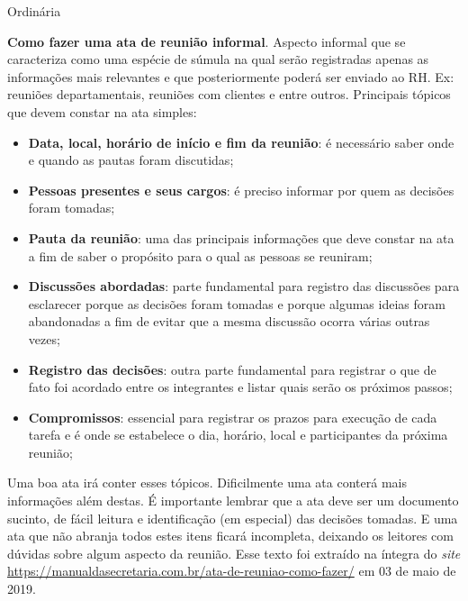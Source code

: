 \documentclass[11pt]{ifscata}
\date{03 de dezembro de 2019}
\begin{document}
\begin{reuniao}{Ordinária} %

\begin{informes}
    \item \textbf{Como fazer uma ata de reunião informal}. Aspecto informal que se caracteriza como uma espécie de súmula na qual serão registradas apenas as informações mais relevantes e que posteriormente poderá ser enviado ao RH. Ex: reuniões departamentais, reuniões com clientes e entre outros. Principais tópicos que devem constar na ata simples:
    \begin{itemize}
        \item \textbf{Data, local, horário de início e fim da reunião}: é necessário saber onde e quando as pautas foram discutidas;
        \item \textbf{Pessoas presentes e seus cargos}: é preciso informar por quem as decisões foram tomadas;
        \item \textbf{Pauta da reunião}: uma das principais informações que deve constar na ata a fim de saber o propósito para o qual as pessoas se reuniram;
        \item \textbf{Discussões abordadas}: parte fundamental para registro das discussões para esclarecer porque as decisões foram tomadas e porque algumas ideias foram abandonadas a fim de evitar que a mesma discussão ocorra várias outras vezes;
        \item \textbf{Registro das decisões}: outra parte fundamental para registrar o que de fato foi acordado entre os integrantes e listar quais serão os próximos passos;
        \item \textbf{Compromissos}: essencial para registrar os prazos para execução de cada tarefa e é onde se estabelece o dia, horário, local e participantes da próxima reunião;
    \end{itemize}
    
    Uma boa ata irá conter esses tópicos. Dificilmente uma ata conterá mais informações além destas. É importante lembrar que a ata deve ser um documento sucinto, de fácil leitura e identificação (em especial) das decisões tomadas. E uma ata que não abranja todos estes itens ficará incompleta, deixando os leitores com dúvidas sobre algum aspecto da reunião. Esse texto foi extraído na íntegra do \textit{site} \url{https://manualdasecretaria.com.br/ata-de-reuniao-como-fazer/} em 03 de maio de 2019.


\end{informes}
\end{reuniao}
\end{document}
